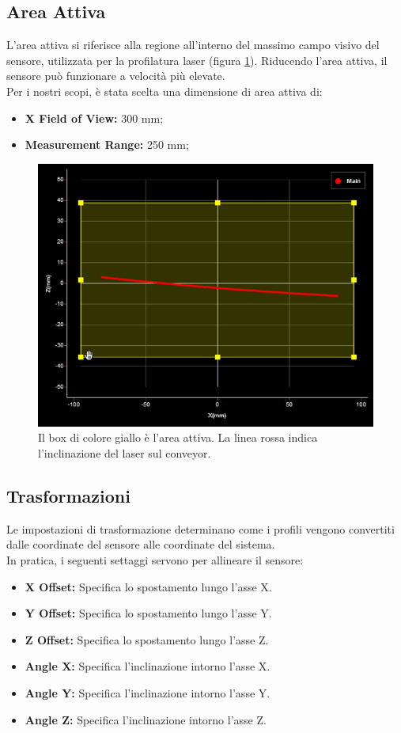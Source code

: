 \subsection{Area Attiva}
L'area attiva si riferisce alla regione all'interno del massimo campo visivo del sensore, utilizzata per la profilatura laser (figura \ref{fig:active_area}). Riducendo l'area attiva, il sensore può funzionare a velocità più elevate.\\
\newline
Per i nostri scopi, è stata scelta una dimensione di area attiva di:

\begin{itemize}
	\item \textbf{X Field of View:} 300 mm;
	\item \textbf{Measurement Range:} 250 mm;
\end{itemize}

\begin{figure}[H]
	\centering
	\includegraphics[width=0.7\columnwidth]{./pictures/active_area.png}
	\caption{Il box di colore giallo è l'area attiva. La linea rossa indica l'inclinazione del laser sul conveyor.}\label{fig:active_area}
\end{figure}

\subsection{Trasformazioni}
Le impostazioni di trasformazione determinano come i profili vengono convertiti dalle coordinate del sensore alle coordinate del sistema.\\
\newline
In pratica, i seguenti settaggi servono per allineare il sensore:

\begin{itemize}
	\item \textbf{X Offset:} Specifica lo spostamento lungo l'asse X.
	\item \textbf{Y Offset:} Specifica lo spostamento lungo l'asse Y.
	\item \textbf{Z Offset:} Specifica lo spostamento lungo l'asse Z.
	\item \textbf{Angle X:} Specifica l'inclinazione intorno l'asse X.
	\item \textbf{Angle Y:} Specifica l'inclinazione intorno l'asse Y.
	\item \textbf{Angle Z:} Specifica l'inclinazione intorno l'asse Z.
\end{itemize}

